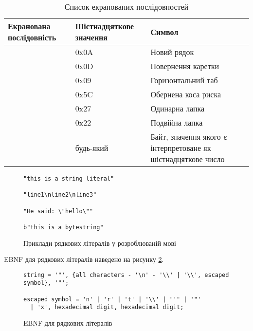 \documentclass[main.tex]{subfiles}
\begin{document}
\begin{table}
  \tabulinesep=1mm
  \begin{tabu}{|l|l|X[l]|}
    \hline
    Екранована послідовність & Шістнадцяткове значення & Символ \\
    \hline
     & 0x0A & Новий рядок \\
    \hline
     & 0x0D & Повернення каретки \\
    \hline
     & 0x09 & Горизонтальний таб \\
    \hline
    \code{\textbackslash{}\textbackslash{}} & 0x5C & Обернена коса риска \\
    \hline
     & 0x27 & Одинарна лапка \\
    \hline
     & 0x22 & Подвійна лапка \\
    \hline
     & будь-який & Байт, значення якого є  інтерпретоване як шістнадцяткове число \\
    \hline
  \end{tabu}
  \caption{Список екранованих послідовностей}
  \label{lang:escape-sequences}
\end{table}

\begin{figure}[h]
  \centering
  \begin{verbatim}
"this is a string literal"

"line1\nline2\nline3"

"He said: \"hello\""

b"this is a bytestring"
  \end{verbatim}
  \caption{Приклади рядкових літералів у розроблюваній мові}
  \label{lang:literals:strings}
\end{figure}

EBNF для рядкових літералів наведено на рисунку \ref{ebnf:string-literals}.

\begin{figure}[h]
  \centering
  \begin{verbatim}
string = '"', {all characters - '\n' - '\\' | '\\', escaped symbol}, '"';

escaped symbol = 'n' | 'r' | 't' | '\\' | "'" | '"'
  | 'x', hexadecimal digit, hexadecimal digit;
  \end{verbatim}
  \caption{EBNF для рядкових літералів}
  \label{ebnf:string-literals}
\end{figure}
\end{document}
